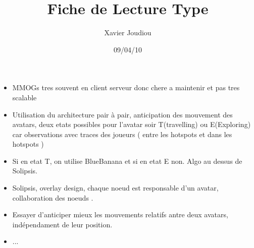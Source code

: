 \documentclass[11pt,a4paper]{article}
\title{Fiche de Lecture Type}
\author{Xavier Joudiou}
\date{09/04/10}
\begin{document}
	
  \begin{itemize}
  \renewcommand{\labelitemi}{$\Rightarrow$}
	\item MMOGs tres souvent en client serveur donc chere a maintenir et pas tres scalable
	\item Utilisation du architecture pair à pair, anticipation des mouvement des avatars, deux etats possibles pour l'avatar soir T(travelling) ou E(Exploring) car observations avec traces des joueurs ( entre les hotspots et dans les hotspots )
	\item Si en etat T, on utilise BlueBanana et si en etat E non. Algo au dessus de Solipsis.
	\item Solipsis, overlay design, chaque noeud est responsable d'un avatar, collaboration des noeuds .
	\item Essayer d'anticiper mieux les mouvements relatifs antre deux avatars, indépendament de leur position.
	\item ...
  \end{itemize}
\end{document}
